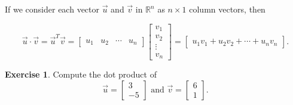 \documentclass{beamer}
\newcommand{\R}{\mathbb{R}}
\newcommand{\fn}{\insertframenumber}
\theoremstyle{definition}
\newtheorem{exercise}{Exercise}
\begin{document}
\begin{frame}{\fn}
	If we consider each vector $\vec u$ and $\vec v$ in $\R^n$ as $n\times 1$ column vectors, then
	
		\[\vec u\cdot\vec v=\vec u^T\vec v=\begin{bmatrix}u_1&u_2&\cdots&u_n\end{bmatrix}\begin{bmatrix}v_1\\v_2\\\vdots\\v_n\end{bmatrix}=\begin{bmatrix}u_1v_1+u_2v_2+\cdots+u_nv_n\end{bmatrix}.\]
	\begin{exercise}
		Compute the dot product of \[\vec u=\begin{bmatrix}3\\-5\end{bmatrix}\text{ and }\vec v=\begin{bmatrix}6\\1\end{bmatrix}.\]
	\end{exercise}
\end{frame}
\end{document}
